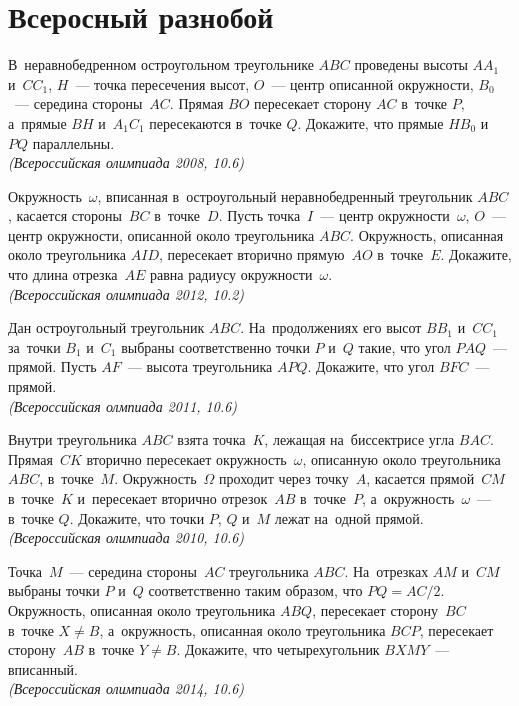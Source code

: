 
\section*{Всеросный разнобой}


\begin{problems}

\item
В~неравнобедренном остроугольном треугольнике $ABC$ проведены высоты
$A A_1$ и~$C C_1$, $H$~--- точка пересечения высот, $O$~--- центр описанной
окружности, $B_0$~--- середина стороны~$AC$.
Прямая $BO$ пересекает сторону $AC$ в~точке $P$, а~прямые $BH$ и~$A_1C_1$
пересекаются в~точке $Q$.
Докажите, что прямые $HB_0$ и~$PQ$ параллельны.
\\\emph{(Всероссийская олимпиада 2008, 10.6)}

\item
Окружность~$\omega$, вписанная в~остроугольный неравнобедренный треугольник
$ABC$, касается стороны~$BC$ в~точке~$D$.
Пусть точка~$I$~--- центр окружности~$\omega$, $O$~--- центр окружности,
описанной около треугольника $ABC$.
Окружность, описанная около треугольника $AID$, пересекает вторично прямую~$AO$
в~точке~$E$.
Докажите, что длина отрезка~$AE$ равна радиусу окружности~$\omega$.
\\\emph{(Всероссийская олимпиада 2012, 10.2)}

\item
Дан остроугольный треугольник $ABC$.
На~продолжениях его высот $B B_1$ и~$C C_1$ за~точки $B_1$ и~$C_1$ выбраны
соответственно точки $P$ и~$Q$ такие, что угол $PAQ$~--- прямой.
Пусть $AF$~--- высота треугольника $APQ$.
Докажите, что угол $BFC$~--- прямой.
\\\emph{(Всероссийская олмпиада 2011, 10.6)}

\item
Внутри треугольника $ABC$ взята точка~$K$, лежащая на~биссектрисе угла $BAC$.
Прямая~$CK$ вторично пересекает окружность~$\omega$, описанную около
треугольника $ABC$, в~точке~$M$.
Окружность~$\Omega$ проходит через точку~$A$, касается прямой~$CM$ в~точке~$K$
и~пересекает вторично отрезок~$AB$ в~точке~$P$, а~окружность~$\omega$~---
в~точке $Q$.
Докажите, что точки $P$, $Q$ и~$M$ лежат на~одной прямой.
\\\emph{(Всероссийская олимпиада 2010, 10.6)}

\item
Точка~$M$~--- середина стороны~$AC$ треугольника $ABC$.
На~отрезках $AM$ и~$CM$ выбраны точки $P$ и~$Q$ соответственно таким образом,
что $PQ = AC / 2$.
Окружность, описанная около треугольника $ABQ$, пересекает сторону~$BC$
в~точке $X \neq B$, а~окружность, описанная около треугольника $BCP$,
пересекает сторону~$AB$ в~точке $Y \neq B$.
Докажите, что четырехугольник $BXMY$~--- вписанный.
\\\emph{(Всероссийская олимпиада 2014, 10.6)}


\end{problems}
